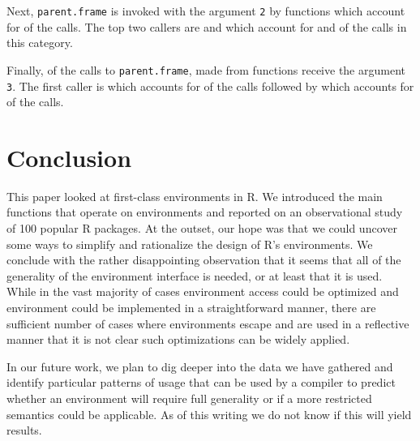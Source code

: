 \documentclass[10pt,review,sigplan,anonymous=true,authorversion=true,nonacm=true]{acmart}
\renewcommand{\c}[1]{\lstinline |#1|\xspace}
\begin{document}
Next, \c{parent.frame} is invoked with the argument \c{2} by
\ParentFrameDepthTwoFunCnt functions which account for
\ParentFrameDepthTwoCallPerc of the calls. The top two callers are
\ParentFrameDepthTwoCallerOneCallerName and
\ParentFrameDepthTwoCallerTwoCallerName which account for
\ParentFrameDepthTwoCallerOneCallPerc and \ParentFrameDepthTwoCallerTwoCallPerc
of the calls in this category.

Finally, \ParentFrameDepthThreeCallPerc of the calls to \c{parent.frame}, made
from \ParentFrameDepthThreeFunCnt functions receive the argument \c{3}. The
first caller is \ParentFrameDepthThreeCallerOneCallerName which accounts for
\ParentFrameDepthThreeCallerOneCallPerc of the calls followed by
\ParentFrameDepthThreeCallerTwoCallerName which accounts for
\ParentFrameDepthThreeCallerTwoCallPerc of the calls.


\section{Conclusion}

This paper looked at first-class environments in R. We introduced the main
functions that operate on environments and reported on an observational study of
100 popular R packages. At the outset, our hope was that we could uncover some
ways to simplify and rationalize the design of R's environments. We conclude
with the rather disappointing observation that it seems that all of the
generality of the environment interface is needed, or at least that it is used.
While in the vast majority of cases environment access could be optimized and
environment could be implemented in a straightforward manner, there are
sufficient number of cases where environments escape and are used in a
reflective manner that it is not clear such optimizations can be widely applied.

In our future work, we plan to dig deeper into the data we have gathered and
identify particular patterns of usage that can be used by a compiler to predict
whether an environment will require full generality or if a more restricted
semantics could be applicable. As of this writing we do not know if this will
yield results.


\end{document}
